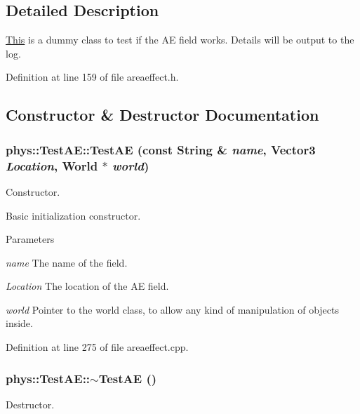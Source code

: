 \subsection{Detailed Description}
\hyperlink{structThis}{This} is a dummy class to test if the AE field works. Details will be output to the log. 

Definition at line 159 of file areaeffect.h.



\subsection{Constructor \& Destructor Documentation}
\hypertarget{classphys_1_1TestAE_a90e5678a05179482d08fc9abd94fe9d6}{
\subsubsection[{TestAE}]{\setlength{\rightskip}{0pt plus 5cm}phys::TestAE::TestAE (const {\bf String} \& {\em name}, \/  {\bf Vector3} {\em Location}, \/  {\bf World} $\ast$ {\em world})}}
\label{d1/dca/classphys_1_1TestAE_a90e5678a05179482d08fc9abd94fe9d6}


Constructor. 

Basic initialization constructor. 
\begin{DoxyParams}{Parameters}
\item[{\em name}]The name of the field. \item[{\em Location}]The location of the AE field. \item[{\em world}]Pointer to the world class, to allow any kind of manipulation of objects inside. \end{DoxyParams}


Definition at line 275 of file areaeffect.cpp.

\hypertarget{classphys_1_1TestAE_aa3ceb77df713b5cafa97495de61e4b0a}{
\subsubsection[{$\sim$TestAE}]{\setlength{\rightskip}{0pt plus 5cm}phys::TestAE::$\sim$TestAE ()}}
\label{d1/dca/classphys_1_1TestAE_aa3ceb77df713b5cafa97495de61e4b0a}


Destructor. 

